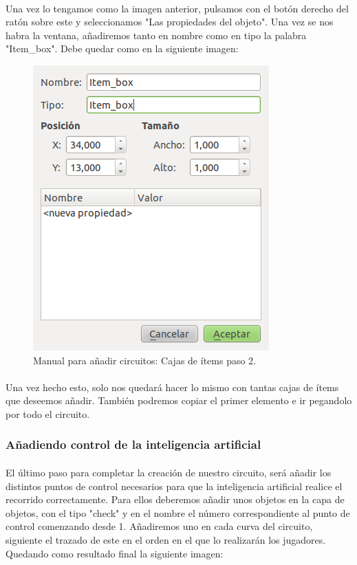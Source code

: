 \paragraph{}
Una vez lo tengamos como la imagen anterior, pulsamos con el botón derecho del ratón sobre este y seleccionamos "Las propiedades
del objeto". Una vez se nos habra la ventana, añadiremos tanto en nombre como en tipo la palabra "Item\_box". Debe quedar como en la
siguiente imagen:

\begin{figure}[H]
  \label{cajas_items2}
  \begin{center}
    \includegraphics[scale=0.5]{imagenes/manualcircuito/cajas_items2.png}
  \end{center}
  \caption{Manual para añadir circuitos: Cajas de ítems paso 2.}
\end{figure}

\paragraph{}
Una vez hecho esto, solo nos quedará hacer lo mismo con tantas cajas de ítems que deseemos añadir. También podremos copiar el 
primer elemento e ir pegandolo por todo el circuito.

\subsubsection{Añadiendo control de la inteligencia artificial}

\paragraph{}
El último paso para completar la creación de nuestro circuito, será añadir los distintos puntos de control necesarios para que
la inteligencia artificial realice el recorrido correctamente. Para ellos deberemos añadir unos objetos en la capa de objetos, con
el tipo "check" y en el nombre el número correspondiente al punto de control comenzando desde 1. Añadiremos uno en cada curva del
circuito, siguiente el trazado de este en el orden en el que lo realizarán los jugadores. Quedando como resultado final la 
siguiente imagen:

